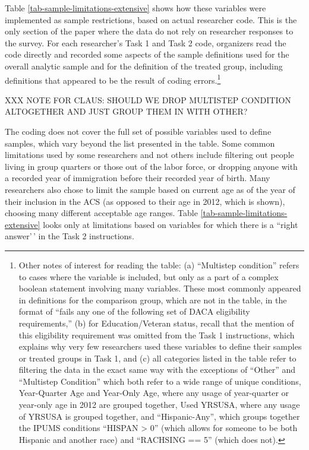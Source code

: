 \documentclass[
  letterpaper,
  DIV=11,
  numbers=noendperiod]{scrartcl}
\begin{document}
Table \ref{tab-sample-limitations-extensive} shows how these variables
were implemented as sample restrictions, based on actual researcher
code. This is the only section of the paper where the data do not rely
on researcher responses to the survey. For each researcher's Task 1 and
Task 2 code, organizers read the code directly and recorded some aspects
of the sample definitions used for the overall analytic sample and for
the definition of the treated group, including definitions that appeared
to be the result of coding errors.\footnote{Other notes of interest for
  reading the table: (a) ``Multistep condition'' refers to cases where
  the variable is included, but only as a part of a complex boolean
  statement involving many variables. These most commonly appeared in
  definitions for the comparison group, which are not in the table, in
  the format of ``fails any one of the following set of DACA eligibility
  requirements,'' (b) for Education/Veteran status, recall that the
  mention of this eligibility requirement was omitted from the Task 1
  instructions, which explains why very few researchers used these
  variables to define their samples or treated groups in Task 1, and (c)
  all categories listed in the table refer to filtering the data in the
  exact same way with the exceptions of ``Other'' and ``Multistep
  Condition'' which both refer to a wide range of unique conditions,
  Year-Quarter Age and Year-Only Age, where any usage of year-quarter or
  year-only age in 2012 are grouped together, Used YRSUSA, where any
  usage of YRSUSA is grouped together, and ``Hispanic-Any'', which
  groups together the IPUMS conditions ``HISPAN \textgreater{} 0''
  (which allows for someone to be both Hispanic and another race) and
  ``RACHSING == 5'' (which does not).}

XXX NOTE FOR CLAUS: SHOULD WE DROP MULTISTEP CONDITION ALTOGETHER AND
JUST GROUP THEM IN WITH OTHER?

The coding does not cover the full set of possible variables used to
define samples, which vary beyond the list presented in the table. Some
common limitations used by some researchers and not others include
filtering out people living in group quarters or those out of the labor
force, or dropping anyone with a recorded year of immigration before
their recorded year of birth. Many researchers also chose to limit the
sample based on current age as of the year of their inclusion in the ACS
(as opposed to their age in 2012, which is shown), choosing many
different acceptable age ranges. Table
\ref{tab-sample-limitations-extensive} looks only at limitations based
on variables for which there is a ``right answer'\,' in the Task 2
instructions.
\end{document}
